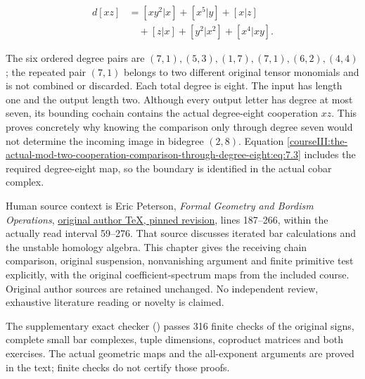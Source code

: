 \begin{equation}
\begin{aligned}
d[xz]&=[xy^2|x]+[x^5|y]+[x|z]\\
 &\quad+[z|x]+[y^2|x^2]+[x^4|xy].
\end{aligned}
\label{courseIII:the-actual-mod-two-cooperation-comparison-through-degree-eight:eq:9.7}
\end{equation}

The six ordered degree pairs are \((7,1),(5,3),(1,7),(7,1),(6,2),(4,4)\); the repeated pair \((7,1)\) belongs to two different original tensor monomials and is not combined or discarded. Each total degree is eight. The input has length one and the output length two. Although every output letter has degree at most seven, its bounding cochain contains the actual degree-eight cooperation \(xz\). This proves concretely why knowing the comparison only through degree seven would not determine the incoming image in bidegree \((2,8)\). Equation \eqref{courseIII:the-actual-mod-two-cooperation-comparison-through-degree-eight:eq:7.3} includes the required degree-eight map, so the boundary is identified in the actual cobar complex.

Human source context is Eric Peterson, \emph{Formal Geometry and Bordism Operations}, \href{https://github.com/ecpeterson/FormalGeomNotes/blob/2f1cd08cb4f7b7b643eec441eae78637bbb71973/cooperations.tex\#L187}{original author TeX, pinned revision}, lines 187--266, within the actually read interval 59--276. That source discusses iterated bar calculations and the unstable homology algebra. This chapter gives the receiving chain comparison, original suspension, nonvanishing argument and finite primitive test explicitly, with the original coefficient-spectrum maps from the included course. Original author sources are retained unchanged. No independent review, exhaustive literature reading or novelty is claimed.

The supplementary exact checker () passes 316 finite checks of the original signs, complete small bar complexes, tuple dimensions, coproduct matrices and both exercises. The actual geometric maps and the all-exponent arguments are proved in the text; finite checks do not certify those proofs.
